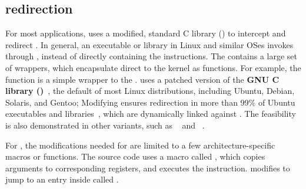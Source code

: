 



\subsection{\Linuxapi{} redirection}

For most applications,
\thelibos{} 
uses a modified, standard C library (\libc{}) to intercept and redirect \linuxapis{}.
In general, an executable or library in Linux and similar OSes invokes \linuxapis{} through \libc{},
instead of directly containing the  instructions.
The \libc{}
contains a large set of \linuxapi{} wrappers,
which encapsulate direct \linuxapis{} to the kernel as functions.
For example, the \libc{} function  is a simple wrapper to the  \linuxapi{}.
\thelibos{} uses a patched version
of the {\bf GNU C library (\glibc{})}~\cite{glibc},
the default \libc{} of most Linux distributions, including Ubuntu, Debian, Solaris, and Gentoo;
Modifying \glibc{}
ensures
\linuxapi{} redirection
in more than 99\% of Ubuntu executables and libraries~\cite{tsai16apistudy},
which are dynamically linked against \glibc{}.
The feasibility is also demonstrated
in other \libc{} variants,
such as ~\cite{uclibc} and ~\cite{musl}. 



For \glibc{}, the modifications
needed for \graphene{}
are limited to a few architecture-specific macros or functions.
The \glibc{} source code uses a macro called
,
which copies \linuxapi{} arguments to corresponding registers, and executes the  instruction.
\graphene{} modifies 
to jump to an entry inside \thelibos{} called .











